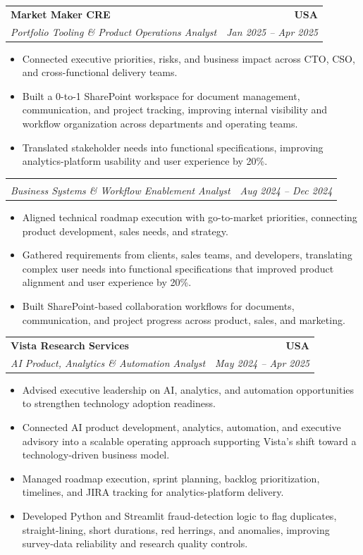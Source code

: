 \documentclass[letterpaper,10pt]{article}
\makeatletter
\newcommand{\resumeItem}[1]{\item \small{#1}}
\newcommand{\resumeSubheading}[4]{
  \vspace{1pt}\item
    \begin{tabular*}{1.0\textwidth}[t]{l@{\extracolsep{\fill}}r}
      \textbf{#1} & \textbf{\small #2} \\
      \textit{\small #3} & \textit{\small #4} \\
    \end{tabular*}\vspace{-6pt}
}
\newcommand{\resumeItemListStart}{\begin{itemize}[leftmargin=0.15in, itemsep=1pt, topsep=3pt]}
\newcommand{\resumeItemListEnd}{\end{itemize}\vspace{-2pt}}
\makeatother
\begin{document}
\vspace{-2pt}

\resumeSubheading
{Market Maker CRE}{USA}
{Portfolio Tooling \& Product Operations Analyst}{Jan 2025 -- Apr 2025}
\resumeItemListStart
\resumeItem{Connected executive priorities, risks, and business impact across CTO, CSO, and cross-functional delivery teams.}
\resumeItem{Built a 0-to-1 SharePoint workspace for document management, communication, and project tracking, improving internal visibility and workflow organization across departments and operating teams.}
\resumeItem{Translated stakeholder needs into functional specifications, improving analytics-platform usability and user experience by 20\%.}
\resumeItemListEnd

\vspace{-2pt}

\resumeSubheading
{}{}
{Business Systems \& Workflow Enablement Analyst}{Aug 2024 -- Dec 2024}
\resumeItemListStart
\resumeItem{Aligned technical roadmap execution with go-to-market priorities, connecting product development, sales needs, and strategy.}
\resumeItem{Gathered requirements from clients, sales teams, and developers, translating complex user needs into functional specifications that improved product alignment and user experience by 20\%.}
\resumeItem{Built SharePoint-based collaboration workflows for documents, communication, and project progress across product, sales, and marketing.}
\resumeItemListEnd

\vspace{-2pt}

\resumeSubheading
{Vista Research Services}{USA}
{AI Product, Analytics \& Automation Analyst}{May 2024 -- Apr 2025}
\resumeItemListStart
\resumeItem{Advised executive leadership on AI, analytics, and automation opportunities to strengthen technology adoption readiness.}
\resumeItem{Connected AI product development, analytics, automation, and executive advisory into a scalable operating approach supporting Vista’s shift toward a technology-driven business model.}
\resumeItem{Managed roadmap execution, sprint planning, backlog prioritization, timelines, and JIRA tracking for analytics-platform delivery.}
\resumeItem{Developed Python and Streamlit fraud-detection logic to flag duplicates, straight-lining, short durations, red herrings, and anomalies, improving survey-data reliability and research quality controls.}
\resumeItemListEnd

\vspace{-2pt}
\end{document}
